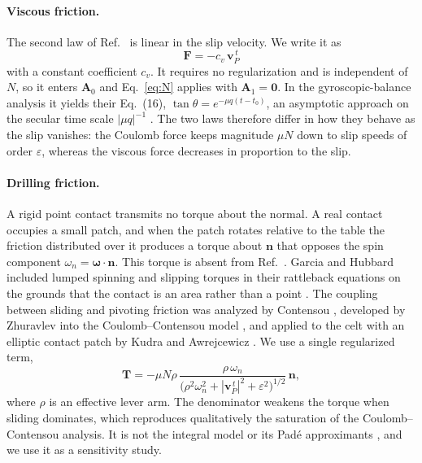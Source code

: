\documentclass[aps,pre,twocolumn,superscriptaddress,amsmath,amssymb,floatfix,nofootinbib]{revtex4-2}
\newcommand{\ve}[1]{\bm{#1}}
\begin{document}
\paragraph*{Viscous friction.}
The second law of Ref.~\cite{Moffatt2002} is linear in the slip velocity. We write it as
\begin{equation}
\ve F=-c_v\,\ve v_P^{\,t}
\label{eq:viscous}
\end{equation}
with a constant coefficient $c_v$. It requires no regularization and is independent of
$N$, so it enters $\ve A_0$ and Eq.~\eqref{eq:N} applies with $\ve A_1=\ve 0$. In the
gyroscopic-balance analysis it yields their Eq.~(16), $\tan\theta=e^{-\mu q(t-t_0)}$, an
asymptotic approach on the secular time scale $|\mu q|^{-1}$ \cite{Moffatt2002}. The two
laws therefore differ in how they behave as the slip vanishes: the Coulomb force keeps
magnitude $\mu N$ down to slip speeds of order $\varepsilon$, whereas the viscous force
decreases in proportion to the slip.

\paragraph*{Drilling friction.}
A rigid point contact transmits no torque about the normal. A real contact occupies a
small patch, and when the patch rotates relative to the table the friction distributed
over it produces a torque about $\ve n$ that opposes the spin component
$\omega_n=\bm\omega\cdot\ve n$. This torque is absent from Ref.~\cite{Moffatt2002}.
Garcia and Hubbard included lumped spinning and slipping torques in their rattleback
equations on the grounds that the contact is an area rather than a point
\cite{Garcia1988}. The coupling between sliding and pivoting friction was analyzed by
Contensou \cite{Contensou1963}, developed by Zhuravlev into the Coulomb--Contensou model
\cite{Zhuravlev1998}, and applied to the celt with an elliptic contact patch by Kudra and
Awrejcewicz \cite{Kudra2015}. We use a single regularized term,
\begin{equation}
\ve T=-\mu N\rho\,
\frac{\rho\,\omega_n}{\bigl(\rho^2\omega_n^2+|\ve v_P^{\,t}|^2+\varepsilon^2\bigr)^{1/2}}\,\ve n,
\label{eq:drill}
\end{equation}
where $\rho$ is an effective lever arm. The denominator weakens the torque when sliding
dominates, which reproduces qualitatively the saturation of the Coulomb--Contensou
analysis. It is not the integral model or its Pad\'e approximants
\cite{Zhuravlev1998,Kudra2015}, and we use it as a sensitivity study.
\end{document}
